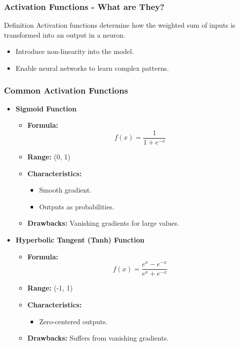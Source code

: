 \documentclass[aspectratio=169]{beamer}
\begin{document}
\begin{frame}[fragile]
    \frametitle{Activation Functions - What are They?}
    \begin{block}{Definition}
        Activation functions determine how the weighted sum of inputs is transformed into an output in a neuron.
    \end{block}
    
    \begin{itemize}
        \item Introduce non-linearity into the model.
        \item Enable neural networks to learn complex patterns.
    \end{itemize}
\end{frame}

\begin{frame}[fragile]
    \frametitle{Common Activation Functions}
    \begin{itemize}
        \item \textbf{Sigmoid Function}
        \begin{itemize}
            \item \textbf{Formula:} $$ f(x) = \frac{1}{1 + e^{-x}} $$
            \item \textbf{Range:} (0, 1)
            \item \textbf{Characteristics:}
            \begin{itemize}
                \item Smooth gradient.
                \item Outputs as probabilities.
            \end{itemize}
            \item \textbf{Drawbacks:} Vanishing gradients for large values.
        \end{itemize}
        
        \item \textbf{Hyperbolic Tangent (Tanh) Function}
        \begin{itemize}
            \item \textbf{Formula:} $$ f(x) = \frac{e^x - e^{-x}}{e^x + e^{-x}} $$
            \item \textbf{Range:} (-1, 1)
            \item \textbf{Characteristics:}
            \begin{itemize}
                \item Zero-centered outputs.
            \end{itemize}
            \item \textbf{Drawbacks:} Suffers from vanishing gradients.
        \end{itemize}
        

\end{itemize}
\end{frame}
\end{document}
